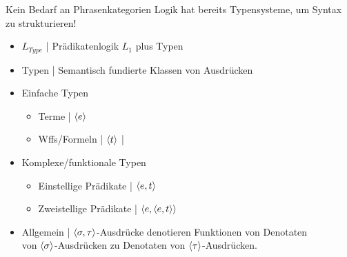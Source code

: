 \begin{frame}
  {Kein Bedarf an Phrasenkategorien}
  \onslide<+->
  \onslide<+->
  Logik hat bereits \alert{Typensysteme}, um Syntax zu strukturieren!\\
  \Halbzeile
  \begin{itemize}[<+->]
    \item \alert{$L_{Type}$} | Prädikatenlogik \alert{$L_1$ plus Typen}
    \item \alert{Typen} | Semantisch fundierte Klassen von Ausdrücken
      \Halbzeile
    \item Einfache Typen
      \begin{itemize}[<+->]
        \item Terme | ${\langle{}e\rangle}$
        \item Wffs\slash Formeln | ${\langle{}t\rangle}$ | 
      \end{itemize}
      \Halbzeile
    \item Komplexe\slash \alert{funktionale} Typen
      \begin{itemize}[<+->]
        \item Einstellige Prädikate | ${\langle{}e,t\rangle}$
        \item Zweistellige Prädikate | ${\langle{}e,{\langle{}e,t\rangle}\rangle}$
      \end{itemize}
      \Halbzeile
    \item Allgemein | ${\langle{}\sigma,\tau\rangle}$-Ausdrücke denotieren Funktionen von Denotaten\\
      von ${\langle{}\sigma\rangle}$-Ausdrücken zu Denotaten von ${\langle{}\tau\rangle}$-Ausdrücken.
  \end{itemize}
\end{frame}

